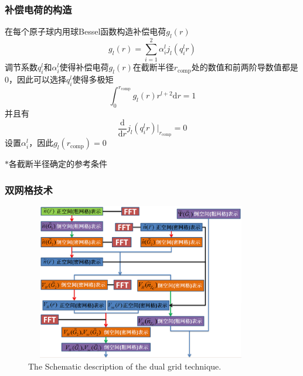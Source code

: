 \documentclass[cjk,slidestop,compress,mathserif,blue]{beamer}
\begin{document}
\frame
{
	\frametitle{补偿电荷的构造}
	在每个原子球内用球\textrm{Bessel}函数构造补偿电荷$g_l(r)$
	$$g_l(r)=\sum_{i=1}^2\alpha_i^lj_l(q_i^lr)$$
	调节系数$q_i^l$和$\alpha_i^l$使得补偿电荷$g_l(r)$在截断半径$r_{\mathrm{\mathrm{comp}}}$处的数值和前两阶导数值都是0，因此可以选择$q_i^l$使得多极矩
	$$\int_0^{r_{\mathrm{comp}}}g_l(r)r^{l+2}\mathrm{d}r=1$$
	并且有
	$$\dfrac{\mathrm{d}}{\mathrm{d}r}j_l(q_i^lr)\bigg|_{r_{\mathrm{comp}}}=0$$
	设置$\alpha_i^l$，因此$g_l(r_{\mathrm{comp}})=0$

	$\ast$各截断半径确定的参考条件\\
	{\fontsize{6.2pt}{4.2pt}}
}

\frame
{
	\frametitle{双网格技术}
\begin{figure}[h!]
	\vspace{-0.2in}
\centering
\includegraphics[height=2.7in,width=4.0in,viewport=0 0 800 600,clip]{Figures/dual_grid-2.png}
\caption{\tiny \textrm{The Schematic description of the dual grid technique.}}%
\label{PAW_dualgrid}
\end{figure} 
}
\end{document}
